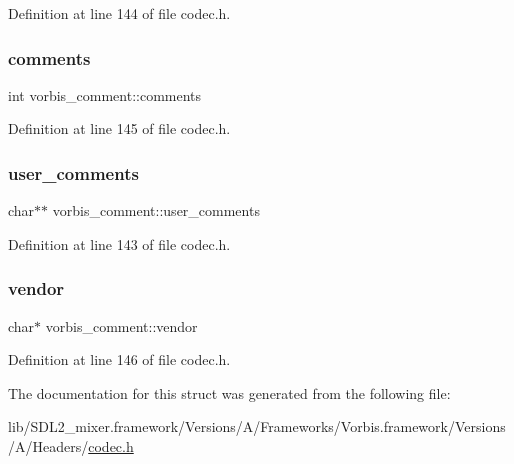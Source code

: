 Definition at line 144 of file codec.\+h.

\mbox{\label{structvorbis__comment_aa338208fb0f485b3818832a7d07dbe92}} 
\subsubsection{\texorpdfstring{comments}{comments}}
{\footnotesize\ttfamily int vorbis\+\_\+comment\+::comments}



Definition at line 145 of file codec.\+h.

\mbox{\label{structvorbis__comment_ac45cb70542b0be5ce3e8d85db6df48ec}} 
\subsubsection{\texorpdfstring{user\_comments}{user\_comments}}
{\footnotesize\ttfamily char$\ast$$\ast$ vorbis\+\_\+comment\+::user\+\_\+comments}



Definition at line 143 of file codec.\+h.

\mbox{\label{structvorbis__comment_a1f25158a2c045a6dd8a13b33b34612d3}} 
\subsubsection{\texorpdfstring{vendor}{vendor}}
{\footnotesize\ttfamily char$\ast$ vorbis\+\_\+comment\+::vendor}



Definition at line 146 of file codec.\+h.



The documentation for this struct was generated from the following file\+:\begin{DoxyCompactItemize}
\item 
lib/\+S\+D\+L2\+\_\+mixer.\+framework/\+Versions/\+A/\+Frameworks/\+Vorbis.\+framework/\+Versions/\+A/\+Headers/\mbox{\hyperlink{codec_8h}{codec.\+h}}\end{DoxyCompactItemize}
